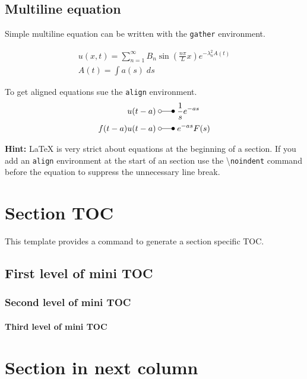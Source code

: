 \documentclass[\papersize,\fontheight,\orientationmode]{article}
\begin{document}
\begin{multicols*}{3}
    \subsection{Multiline equation}
    Simple multiline equation can be written with the \texttt{gather} environment.

    \begin{gather*}
        u(x,t) =\sum_{n=1}^\infty B_n\sin(\frac{n\pi}Lx)e^{-\lambda_n^2 A(t)} \\
        A(t)=\int a(s)\;ds
    \end{gather*}

    To get aligned equations sue the \texttt{align} environment.
    \begin{align*}
        u(t-a)       \; & \laplace\; \frac{1}{s}e^{-as} \\
        f(t-a)u(t-a) \; & \laplace\; e^{-as}F(s)
    \end{align*}

    \textbf{Hint:} \LaTeX{} is very strict about equations at the beginning of a section.
    If you add an \texttt{align} environment at the start of an section use the
    \textbackslash{}\texttt{noindent} command before the equation to suppress the unnecessary
    line break.

    \section{Section TOC}
    This template provides a command to generate a section specific TOC.
    \createsectiontoc{}

    \subsection{First level of mini TOC}
    \subsubsection{Second level of mini TOC}
    \paragraph{Third level of mini TOC}


    \newcol{}

    \section{Section in next column}


\end{multicols*}
\end{document}
